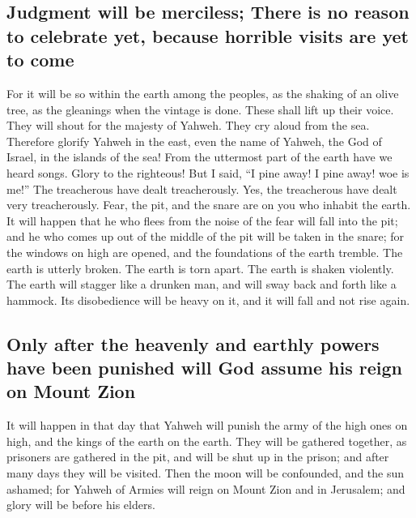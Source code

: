 \hypertarget{judgment-will-be-merciless-there-is-no-reason-to-celebrate-yet-because-horrible-visits-are-yet-to-come}{%
\subsection{Judgment will be merciless; There is no reason to celebrate
yet, because horrible visits are yet to
come}\label{judgment-will-be-merciless-there-is-no-reason-to-celebrate-yet-because-horrible-visits-are-yet-to-come}}

 For it will be so within the earth among the peoples, as
the shaking of an olive tree, as the gleanings when the vintage is done.
 These shall lift up their voice. They will shout for the
majesty of Yahweh. They cry aloud from the sea. 
Therefore glorify Yahweh in the east, even the name of Yahweh, the God
of Israel, in the islands of the sea!  From the uttermost
part of the earth have we heard songs. Glory to the righteous! But I
said, ``I pine away! I pine away! woe is me!'' The treacherous have
dealt treacherously. Yes, the treacherous have dealt very treacherously.
 Fear, the pit, and the snare are on you who inhabit the
earth.  It will happen that he who flees from the noise
of the fear will fall into the pit; and he who comes up out of the
middle of the pit will be taken in the snare; for the windows on high
are opened, and the foundations of the earth tremble. 
The earth is utterly broken. The earth is torn apart. The earth is
shaken violently.  The earth will stagger like a drunken
man, and will sway back and forth like a hammock. Its disobedience will
be heavy on it, and it will fall and not rise again.

\hypertarget{only-after-the-heavenly-and-earthly-powers-have-been-punished-will-god-assume-his-reign-on-mount-zion}{%
\subsection{Only after the heavenly and earthly powers have been
punished will God assume his reign on Mount
Zion}\label{only-after-the-heavenly-and-earthly-powers-have-been-punished-will-god-assume-his-reign-on-mount-zion}}

 It will happen in that day that Yahweh will punish the
army of the high ones on high, and the kings of the earth on the earth.
 They will be gathered together, as prisoners are
gathered in the pit, and will be shut up in the prison; and after many
days they will be visited.  Then the moon will be
confounded, and the sun ashamed; for Yahweh of Armies will reign on
Mount Zion and in Jerusalem; and glory will be before his elders.

